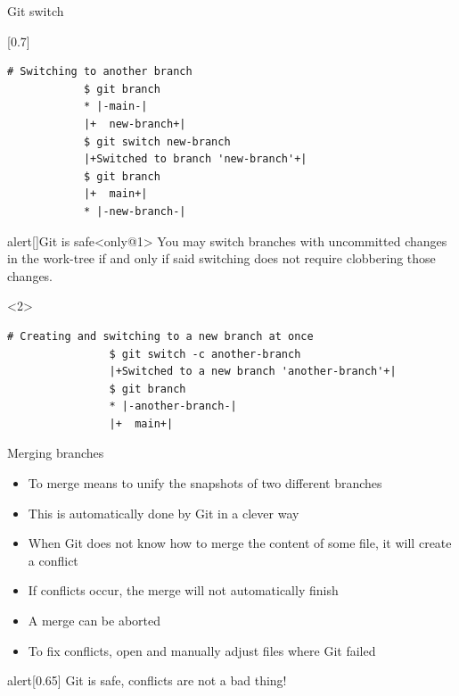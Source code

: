 \documentclass[usenames,svgnames,14pt]{beamer}
\begin{document}
\begin{frame}[fragile]{Git switch}
    \vspace{-8mm}
    \begin{overlayarea}{\textwidth}{0.8\textheight}
        \begin{varblock}{}[0.7\textwidth]{}
        \end{varblock}
        \begin{lstlisting}[style=MyBash]
            # Switching to another branch
            $ git branch
            * |-main-|
            |+  new-branch+|
            $ git switch new-branch
            |+Switched to branch 'new-branch'+|
            $ git branch
            |+  main+|
            * |-new-branch-|
        \end{lstlisting}
        \begin{varblock}{alert}[\textwidth]{Git is safe}<only@1>
            \small
            You may switch branches with uncommitted changes in the work-tree if and only if said switching does not require clobbering those changes.
        \end{varblock}
        \begin{onlyenv}<2>
            \begin{lstlisting}[style=MyBash]
                # Creating and switching to a new branch at once
                $ git switch -c another-branch
                |+Switched to a new branch 'another-branch'+|
                $ git branch
                * |-another-branch-|
                |+  main+|
            \end{lstlisting}
        \end{onlyenv}
    \end{overlayarea}
\end{frame}
\begin{frame}{Merging branches}
    \setlength{\leftmargini}{0.6cm}
    \begin{itemize}
        \item To merge means to unify the snapshots of two different branches
        \item This is automatically done by Git in a clever way
        \item When Git does not know how to merge the content of some file, it will create a conflict
        \item If conflicts occur, the merge will not automatically finish
        \item A merge can be aborted
        \item To fix conflicts, open and manually adjust files where Git failed
    \end{itemize}
    \medskip
    \begin{varblock}{alert}[0.65\textwidth]{}
        \alert{Git is safe, conflicts are not a bad thing!}
    \end{varblock}
\end{frame}
\end{document}
